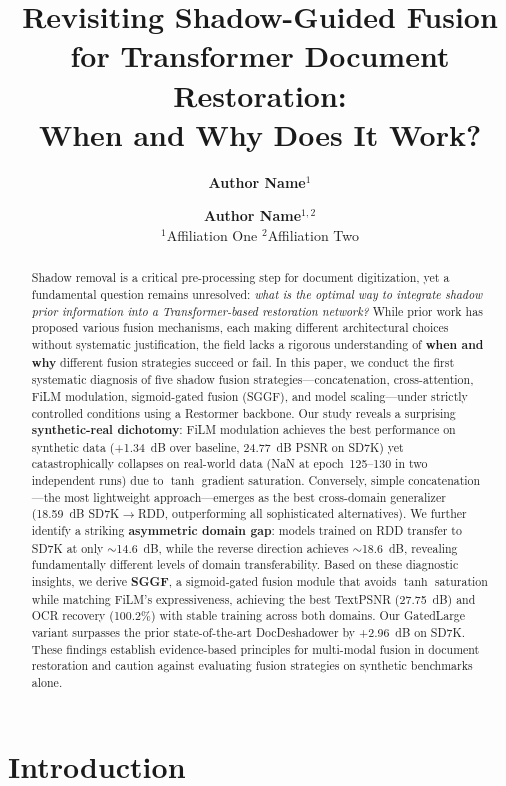 \documentclass[11pt]{article}
\title{\textbf{Revisiting Shadow-Guided Fusion for Transformer Document Restoration:\\When and Why Does It Work?}}
\author{
  \textbf{Author Name}$^{1}$ \and \textbf{Author Name}$^{1,2}$ \\
  $^{1}$Affiliation One \quad $^{2}$Affiliation Two
}
\date{}
\begin{document}
\maketitle

\begin{abstract}
Shadow removal is a critical pre-processing step for document digitization, yet a fundamental question remains unresolved: \textit{what is the optimal way to integrate shadow prior information into a Transformer-based restoration network?}
While prior work has proposed various fusion mechanisms, each making different architectural choices without systematic justification, the field lacks a rigorous understanding of \textbf{when and why} different fusion strategies succeed or fail.
In this paper, we conduct the first systematic diagnosis of five shadow fusion strategies---concatenation, cross-attention, FiLM modulation, sigmoid-gated fusion (SGGF), and model scaling---under strictly controlled conditions using a Restormer backbone.
Our study reveals a surprising \textbf{synthetic-real dichotomy}: FiLM modulation achieves the best performance on synthetic data (+1.34~dB over baseline, 24.77~dB PSNR on SD7K) yet catastrophically collapses on real-world data (NaN at epoch~125--130 in two independent runs) due to $\tanh$ gradient saturation.
Conversely, simple concatenation---the most lightweight approach---emerges as the best cross-domain generalizer (18.59~dB SD7K$\rightarrow$RDD, outperforming all sophisticated alternatives).
We further identify a striking \textbf{asymmetric domain gap}: models trained on RDD transfer to SD7K at only $\sim$14.6~dB, while the reverse direction achieves $\sim$18.6~dB, revealing fundamentally different levels of domain transferability.
Based on these diagnostic insights, we derive \textbf{SGGF}, a sigmoid-gated fusion module that avoids $\tanh$ saturation while matching FiLM's expressiveness, achieving the best TextPSNR (27.75~dB) and OCR recovery (100.2\%) with stable training across both domains.
Our GatedLarge variant surpasses the prior state-of-the-art DocDeshadower by +2.96~dB on SD7K.
These findings establish evidence-based principles for multi-modal fusion in document restoration and caution against evaluating fusion strategies on synthetic benchmarks alone.
\end{abstract}

\section{Introduction}
\end{document}
